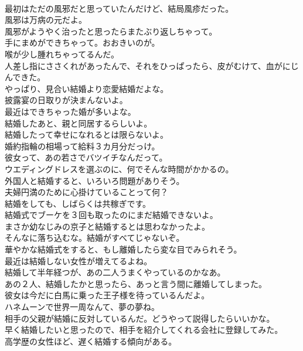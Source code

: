 \documentclass[8pt]{extreport}
\begin{document}
\begin{CJK}{UTF8}{min}
\\	最初はただの風邪だと思っていたんだけど、結局風疹だった。	
\\	風邪は万病の元だよ。	
\\	風邪がようやく治ったと思ったらまたぶり返しちゃって。	
\\	手にまめができちゃって。おおきいのが。	
\\	喉が少し腫れちゃってるんだ。	
\\	人差し指にささくれがあったんで、それをひっぱったら、皮がむけて、血がにじんできた。	
\\	やっぱり、見合い結婚より恋愛結婚だよな。	
\\	披露宴の日取りが決まんないよ。	
\\	最近はできちゃった婚が多いよな。	
\\	結婚したあと、親と同居するらしいよ。	
\\	結婚したって幸せになれるとは限らないよ。	
\\	婚約指輪の相場って給料３カ月分だっけ。	
\\	彼女って、あの若さでバツイチなんだって。	
\\	ウエディングドレスを選ぶのに、何でそんな時間がかかるの。	
\\	外国人と結婚すると、いろいろ問題がありそう。	
\\	夫婦円満のために心掛けていることって何？	
\\	結婚をしても、しばらくは共稼ぎです。	
\\	結婚式でブーケを３回も取ったのにまだ結婚できないよ。	
\\	まさか幼なじみの京子と結婚するとは思わなかったよ。	
\\	そんなに落ち込むな。結婚がすべてじゃないぞ。	
\\	華やかな結婚式をすると、もし離婚したら変な目でみられそう。	
\\	最近は結婚しない女性が増えてるよね。	
\\	結婚して半年経つが、あの二人うまくやっているのかなあ。	
\\	あの２人、結婚したかと思ったら、あっと言う間に離婚してしまった。	
\\	彼女は今だに白馬に乗った王子様を待っているんだよ。	
\\	ハネムーンで世界一周なんて、夢の夢ね。	
\\	相手の父親が結婚に反対しているんだ。どうやって説得したらいいかな。	
\\	早く結婚したいと思ったので、相手を紹介してくれる会社に登録してみた。	
\\	高学歴の女性ほど、遅く結婚する傾向がある。	

\end{CJK}
\end{document}
